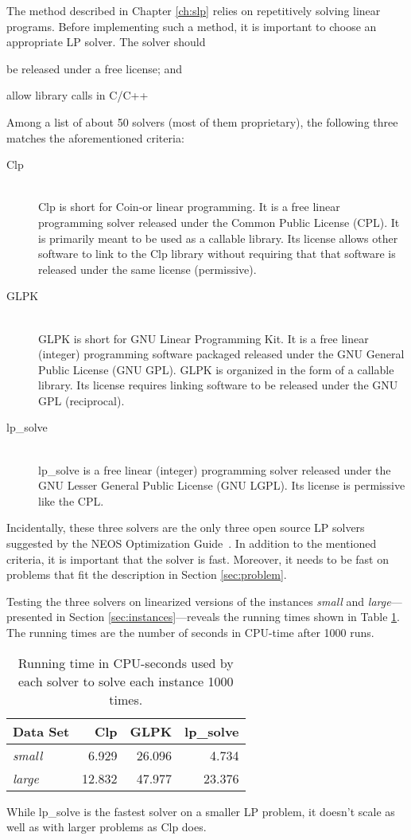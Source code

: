 The method described in Chapter \ref{ch:slp} relies on repetitively solving
linear programs. Before implementing such a method, it is important to choose
an appropriate LP solver. The solver should 
\begin{inparaenum}
\item be released under a free license; and
\item allow library calls in C/C++
\end{inparaenum}

Among a list of about 50 solvers (most of them proprietary), the
following three matches the aforementioned criteria:
\begin{description}
\item[Clp] \hfill \\
Clp is short for Coin-or linear programming. It is a free linear programming
solver released under the Common Public License (CPL). It is primarily meant to
be used as a callable library. Its license allows other software to link to the
Clp library without requiring that that software is released under the same
license (permissive). \cite{clp}
\item[GLPK] \hfill \\
GLPK is short for GNU Linear Programming Kit. It is a free linear (integer)
programming software packaged released under the GNU General Public License
(GNU GPL). GLPK is organized in the form of a callable library. Its license
requires linking software to be released under the GNU GPL (reciprocal).
\cite{glpk}
\item[lp\_solve] \hfill \\
lp\_solve is a free linear (integer) programming solver released under the GNU 
Lesser General Public License (GNU LGPL). Its license is permissive like the
CPL. \cite{lpsolve}
\end{description}
Incidentally, these three solvers are the only three open source LP solvers
suggested by the NEOS Optimization Guide~\cite{neos}.
In addition to the mentioned criteria, it is important that the solver is
fast.
Moreover, it needs to be fast on problems that fit the description in
Section \ref{sec:problem}.

Testing the three solvers on linearized versions of the instances
\textit{small} and \textit{large}---presented in
Section \ref{sec:instances}---reveals the running times shown in Table
\ref{table:lpres}.
The running times are the number of seconds in CPU-time after 1000 runs.

\begin{table}[ht!]
    \centering
    \caption{Running time in CPU-seconds used by each solver to solve each
             instance 1000 times.}
    \begin{tabular}{lrrr}
        Data Set       & Clp    & GLPK   & lp\_solve \\ \hline
        \textit{small} & 6.929  & 26.096 & 4.734 \\
        \textit{large} & 12.832 & 47.977 & 23.376
    \end{tabular}
    \label{table:lpres}
\end{table}
While lp\_solve is the fastest solver on a smaller LP problem, it doesn't
scale as well as with larger problems as Clp does.

